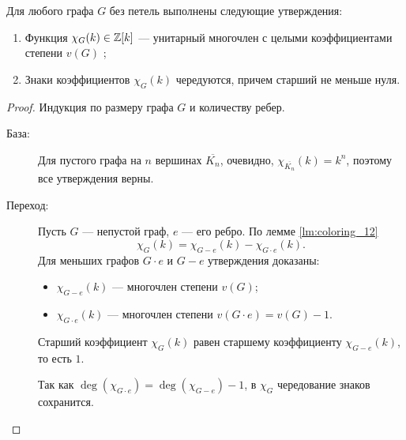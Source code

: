 \begin{theorem}
    Для любого графа $G$ без петель выполнены следующие утверждения:
	\begin{enumerate}
		\item Функция $\chi_G(k) \in \mathbb{Z}[k]$ --- унитарный многочлен с целыми коэффициентами степени $v(G)$ ;
		\item Знаки коэффициентов $\chi_G(k)$ чередуются, причем старший не меньше нуля.
	\end{enumerate}
\end{theorem}
\begin{proof}
    Индукция по размеру графа $G$ и количеству ребер.
	\begin{description}
		\item[База:] Для пустого графа на $n$ вершинах $\overline{K_n}$, очевидно, 
			$\chi_{\overline{K_n}}(k) = k^{n}$, поэтому все утверждения верны.
		\item[Переход:] Пусть $G$ --- непустой граф, $e $ --- его ребро. По лемме \ref{lm:coloring_12} 
			\[
			\chi_G(k) = \chi_{G-e}(k) - \chi_{G \cdot e}(k)
			.\] 
			Для меньших графов $G \cdot e$ и $G-e$ утверждения доказаны:
			\begin{itemize}
				\item $\chi_{G-e}(k)$ --- многочлен степени $v(G)$;
				\item $\chi_{G \cdot e}(k)$ --- многочлен степени $v(G \cdot e) = v(G) - 1$.
			\end{itemize}
			
			Старший коэффициент $\chi_G(k)$ равен старшему коэффициенту $\chi_{G - e}(k)$, то есть $1$.

			Так как $\deg(\chi_{G \cdot e}) = \deg(\chi_{G-e}) - 1$, в $\chi_G$ чередование знаков сохранится.
	\end{description}
\end{proof}
